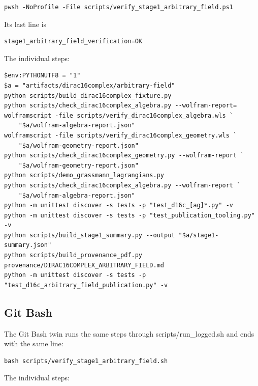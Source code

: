 \documentclass[11pt]{article}
\begin{document}
\begin{Verbatim}[fontsize=\small]
pwsh -NoProfile -File scripts/verify_stage1_arbitrary_field.ps1
\end{Verbatim}

Its last line is

\begin{Verbatim}[fontsize=\small]
stage1_arbitrary_field_verification=OK
\end{Verbatim}

The individual steps:

\begin{Verbatim}[fontsize=\small]
$env:PYTHONUTF8 = "1"
$a = "artifacts/dirac16complex/arbitrary-field"
python scripts/build_dirac16complex_fixture.py
python scripts/check_dirac16complex_algebra.py --wolfram-report=
wolframscript -file scripts/verify_dirac16complex_algebra.wls `
    "$a/wolfram-algebra-report.json"
wolframscript -file scripts/verify_dirac16complex_geometry.wls `
    "$a/wolfram-geometry-report.json"
python scripts/check_dirac16complex_geometry.py --wolfram-report `
    "$a/wolfram-geometry-report.json"
python scripts/demo_grassmann_lagrangians.py
python scripts/check_dirac16complex_algebra.py --wolfram-report `
    "$a/wolfram-algebra-report.json"
python -m unittest discover -s tests -p "test_d16c_[ag]*.py" -v
python -m unittest discover -s tests -p "test_publication_tooling.py" -v
python scripts/build_stage1_summary.py --output "$a/stage1-summary.json"
python scripts/build_provenance_pdf.py provenance/DIRAC16COMPLEX_ARBITRARY_FIELD.md
python -m unittest discover -s tests -p "test_d16c_arbitrary_field_publication.py" -v
\end{Verbatim}

\subsection{Git Bash}

The Git Bash twin runs the same steps through scripts/run\_logged.sh and ends with the same line:

\begin{Verbatim}[fontsize=\small]
bash scripts/verify_stage1_arbitrary_field.sh
\end{Verbatim}

The individual steps:
\end{document}
